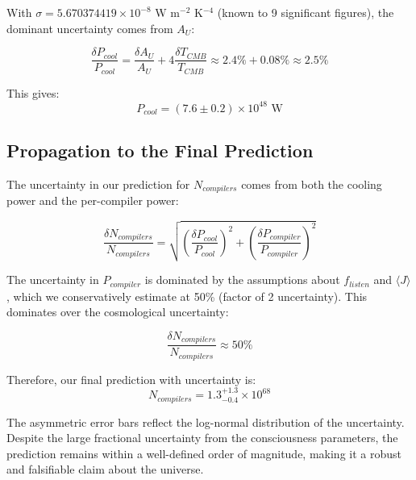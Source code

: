 \documentclass[11pt,a4paper]{article}
\theoremstyle{definition}
\theoremstyle{remark}
\begin{document}
With \(\sigma = 5.670374419 \times 10^{-8}\) W m\(^{-2}\) K\(^{-4}\) (known to 9 significant figures), the dominant uncertainty comes from \(A_U\):

\begin{equation}
    \frac{\delta P_{cool}}{P_{cool}} = \frac{\delta A_U}{A_U} + 4\frac{\delta T_{CMB}}{T_{CMB}} \approx 2.4\% + 0.08\% \approx 2.5\%
\end{equation}

This gives:
\begin{equation}
    P_{cool} = (7.6 \pm 0.2) \times 10^{48} \text{ W}
\end{equation}

\subsection{Propagation to the Final Prediction}

The uncertainty in our prediction for \(N_{compilers}\) comes from both the cooling power and the per-compiler power:

\begin{equation}
    \frac{\delta N_{compilers}}{N_{compilers}} = \sqrt{\left(\frac{\delta P_{cool}}{P_{cool}}\right)^2 + \left(\frac{\delta P_{compiler}}{P_{compiler}}\right)^2}
\end{equation}

The uncertainty in \(P_{compiler}\) is dominated by the assumptions about \(f_{listen}\) and \(\langle J \rangle\), which we conservatively estimate at 50\% (factor of 2 uncertainty). This dominates over the cosmological uncertainty:

\begin{equation}
    \frac{\delta N_{compilers}}{N_{compilers}} \approx 50\%
\end{equation}

Therefore, our final prediction with uncertainty is:
\begin{equation}
    N_{compilers} = 1.3_{-0.4}^{+1.3} \times 10^{68}
\end{equation}

The asymmetric error bars reflect the log-normal distribution of the uncertainty. Despite the large fractional uncertainty from the consciousness parameters, the prediction remains within a well-defined order of magnitude, making it a robust and falsifiable claim about the universe.
\end{document}
